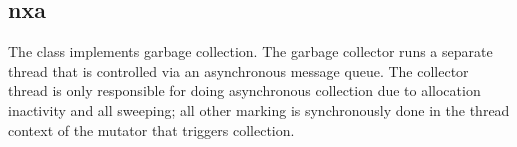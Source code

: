 %
%
%
%
%              

\subsection{nxa}
\label{nxa}

The  class implements garbage collection.  The garbage collector
runs a separate thread that is controlled via an asynchronous message queue.
The collector thread is only responsible for doing asynchronous collection due
to allocation inactivity and all sweeping; all other marking is synchronously
done in the thread context of the mutator that triggers collection.


